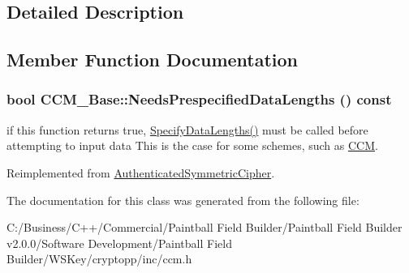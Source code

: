 \subsection{Detailed Description}


\subsection{Member Function Documentation}
\hypertarget{class_c_c_m___base_a7738d2cc1969a72ee2693e49ace9565b}{
\subsubsection[{NeedsPrespecifiedDataLengths}]{\setlength{\rightskip}{0pt plus 5cm}bool CCM\_\-Base::NeedsPrespecifiedDataLengths () const}}
\label{class_c_c_m___base_a7738d2cc1969a72ee2693e49ace9565b}


if this function returns true, \hyperlink{class_authenticated_symmetric_cipher_a7684bed45aa7e8b19de43fcb25b68c57}{SpecifyDataLengths()} must be called before attempting to input data This is the case for some schemes, such as \hyperlink{struct_c_c_m}{CCM}. 

Reimplemented from \hyperlink{class_authenticated_symmetric_cipher_a52595d1c7b43c7a416da2fffba46330b}{AuthenticatedSymmetricCipher}.

The documentation for this class was generated from the following file:\begin{DoxyCompactItemize}
\item 
C:/Business/C++/Commercial/Paintball Field Builder/Paintball Field Builder v2.0.0/Software Development/Paintball Field Builder/WSKey/cryptopp/inc/ccm.h\end{DoxyCompactItemize}
